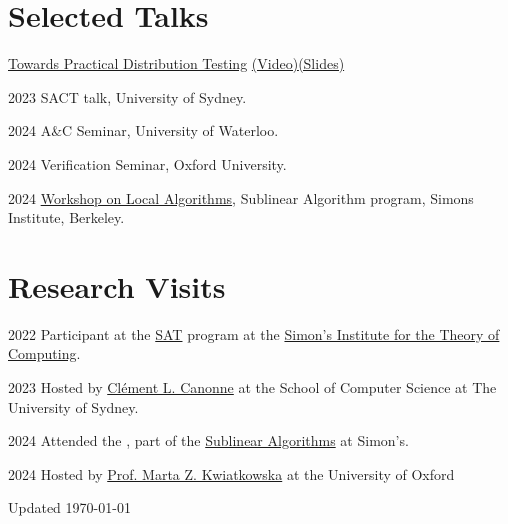 \documentclass[12pt,letterpaper]{report}
\begin{document}
	\section*{Selected Talks}
	\begin{tablist}
		\item[\underline{Towards Practical Distribution Testing}   \href{https://www.youtube.com/live/LexsPa-iGA4?si=b_wZrOyOpPlYB9VR}{(Video)}\href{https://simons.berkeley.edu/sites/default/files/2024-08/Yash\%20Pote_WOLA\%20Slides.pdf}{(Slides)}] 
		
		\item[2023]	SACT talk, University of Sydney. 
		
		\item[2024] A\&C Seminar, University of Waterloo.
		
		\item[2024]	Verification Seminar, Oxford University.
				
		\item[2024]	\href{https://simons.berkeley.edu/workshops/workshop-local-algorithms-wola}{Workshop on Local Algorithms}, Sublinear Algorithm program, Simons Institute, Berkeley.
	\end{tablist}
	
		\section*{Research Visits}
	\begin{tablist}
		\item[2022]
	     Participant at the \href{https://simons.berkeley.edu/programs/sat2021}{SAT} program at the \href{https://simons.berkeley.edu/}{Simon's Institute for the Theory of Computing}.
		
		\item[2023]
		 Hosted by \href{https://ccanonne.github.io/}{Clément L. Canonne} at the School of Computer Science at The University of Sydney. 
		
		\item[2024]
		Attended the  , part of the  \href{https://simons.berkeley.edu/programs/sublinear-algorithms/}{Sublinear Algorithms} at Simon's.
		
		\item[2024]	Hosted by  \href{https://ccanonne.github.io/}{Prof. Marta Z. Kwiatkowska} at the University of Oxford
	\end{tablist}
	
	
	\begin{center}
		\vfill
		Updated \monthyeardate\today
	\end{center}
	
\end{document}
